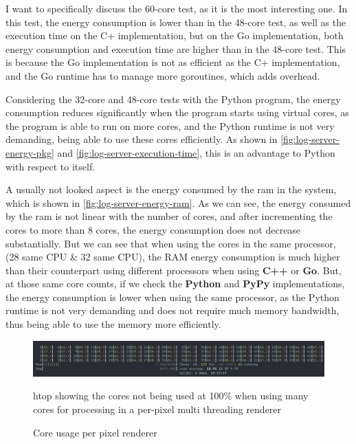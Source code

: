 I want to specifically discuss the 60-core test, as it is the most interesting one. In this test, the energy consumption is lower than in the 48-core test, as well as the execution time on the C\++ implementation, but on the Go implementation, both energy consumption and execution time are higher than in the 48-core test. This is because the Go implementation is not as efficient as the C\++ implementation, and the Go runtime has to manage more goroutines, which adds overhead.

Considering the 32-core and 48-core tests with the Python program, the energy consumption reduces significantly when the program starts using virtual cores, as the program is able to run on more cores, and the Python runtime is not very demanding, being able to use these cores efficiently. As shown in \autoref{fig:log-server-energy-pkg} and \autoref{fig:log-server-execution-time}, this is an advantage to Python with respect to itself.


A usually not looked aspect is the energy consumed by the \gls{ram} in the system, which is shown in \autoref{fig:log-server-energy-ram}. As we can see, the energy consumed by the \gls{ram} is not linear with the number of cores, and after incrementing the cores to more than $8$ cores, the energy consumption does not decrease substantially. But we can see that when using the cores in the same processor, (28 same CPU \& 32 same CPU), the RAM energy consumption is much higher than their counterpart using different processors when using \textbf{C++} or \textbf{Go}. But, at those same core counts, if we check the \textbf{Python} and \textbf{PyPy} implementations, the energy consumption is lower when using the same processor, as the Python runtime is not very demanding and does not require much memory bandwidth, thus being able to use the memory more efficiently.



\begin{figure}
    \centering
    \includegraphics[width=1\linewidth]{img/htop_not_running_100_60_cores.png}
    \caption{Core usage per pixel renderer}{\gls{htop} showing the cores not being used at 100\% when using many cores for processing in a per-pixel multi threading renderer }
    \label{fig:htop_60_not_100}
\end{figure}

